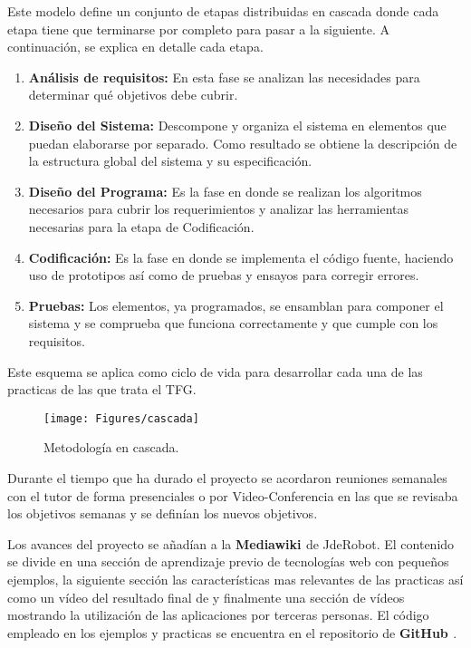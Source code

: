 Este modelo define un conjunto de etapas distribuidas en cascada donde cada etapa tiene que terminarse por completo para pasar a la siguiente. A continuación, se explica en detalle cada etapa.
\begin{enumerate}
\item \textbf{Análisis de requisitos:} En esta fase se analizan las necesidades para determinar qué objetivos debe cubrir.
\item \textbf{Diseño del Sistema:} Descompone y organiza el sistema en elementos que puedan elaborarse por separado. Como resultado se obtiene la descripción de la estructura global del sistema y su especificación.
\item \textbf{Diseño del Programa:} Es la fase en donde se realizan los algoritmos necesarios para cubrir los requerimientos y analizar las herramientas necesarias para la etapa de Codificación.
\item \textbf{Codificación:} Es la fase en donde se implementa el código fuente, haciendo uso de prototipos así como de pruebas y ensayos para corregir errores.
\item \textbf{Pruebas:} Los elementos, ya programados, se ensamblan para componer el sistema y se comprueba que funciona correctamente y que cumple con los requisitos.
\end{enumerate}
Este esquema se aplica como ciclo de vida para desarrollar cada una de las practicas de las que trata el TFG.
\begin{figure}[!h]
\centering
\texttt{[image: Figures/cascada]}
\decoRule
\caption[Metodología en cascada]{Metodología en cascada.}
\label{fig:espiral}
\end{figure}

Durante el tiempo que ha durado el proyecto se acordaron reuniones semanales con el tutor de forma presenciales o por Video-Conferencia en las que se revisaba los objetivos semanas y se definían los nuevos objetivos.

Los avances del proyecto se añadían a la \textbf{Mediawiki \cite{Mediawiki}} de JdeRobot. El contenido se divide en una sección de aprendizaje previo de tecnologías web con  pequeños ejemplos, la siguiente sección las características mas relevantes de las practicas así como un vídeo del resultado final de y finalmente una sección de vídeos mostrando la utilización de las aplicaciones por terceras personas. El código empleado en los ejemplos y practicas se encuentra en el repositorio de \textbf{GitHub \cite{Repositorio}}.
